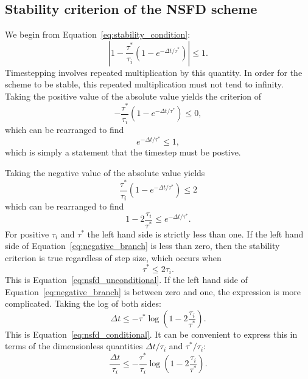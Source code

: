 \documentclass[preprint,12pt,authoryear]{elsarticle}
\begin{document}
\begin{subappendices}

\section{Stability criterion of the NSFD scheme}
\label{appendix:stability}
We begin from Equation~\eqref{eq:stability_condition}:
\begin{equation}
\left| 1 - \frac{\tau^*}{\tau_i} \left(1-e^{-\Delta t/\tau^*} \right) \right| \le 1.
\end{equation}
Timestepping involves repeated multiplication by this quantity. In order for
the scheme to be stable, this repeated multiplication must not tend to infinity.
Taking the positive value of the absolute value yields the criterion of 
\begin{equation}
- \frac{\tau^*}{\tau_i} \left(1-e^{-\Delta t/\tau^*} \right) \le 0,
\end{equation}
which can be rearranged to find
\begin{equation}
e^{-\Delta t/\tau^*} \le 1,
\end{equation}
which is simply a statement that the timestep must be postive.

Taking the negative value of the absolute value yields
\begin{equation}
  \frac{\tau^*}{\tau_i} \left(1-e^{-\Delta t/\tau^*} \right)  \le 2
\end{equation}
which can be rearranged to find
\begin{equation}
 1 - 2 \frac{\tau_i}{\tau^*} \le e^{-\Delta t/\tau^*}.
\label{eq:negative_branch}
\end{equation}
For positive $\tau_i$ and $\tau^*$ the left hand side is strictly less than one.
If the left hand side of Equation~\eqref{eq:negative_branch} is less than zero, 
then the stability criterion is true regardless of step size, which occurs when
\begin{equation}
\tau^* \le 2 \tau_i.
\end{equation}
This is Equation~\eqref{eq:nsfd_unconditional}.
If the left hand side of Equation~\eqref{eq:negative_branch} is between zero and one, 
the expression is more complicated. Taking the log of both sides:
\begin{equation}
\Delta t \le -\tau^* \log \left(1 - 2 \frac{\tau_i}{\tau^*} \right).
\end{equation}
This is Equation~\eqref{eq:nsfd_conditional}.
It can be convenient to express this in terms of the dimensionless quantities $\Delta t/ \tau_i$ and $\tau^*/\tau_i$:
\begin{equation}
\frac{\Delta t}{\tau_i} \le -\frac{\tau^*}{\tau_i} \log \left(1 - 2 \frac{\tau_i}{\tau^*} \right).
\end{equation}
\end{subappendices}
\end{document}
